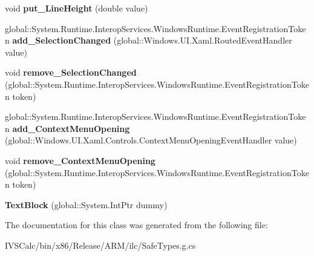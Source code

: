 \begin{DoxyCompactItemize}
void {\bfseries put\+\_\+\+Line\+Height} (double value)
\item 
\mbox{\label{class_windows_1_1_u_i_1_1_xaml_1_1_controls_1_1_text_block_af80d81341031136a13a2687720d46da0}} 
global\+::\+System.\+Runtime.\+Interop\+Services.\+Windows\+Runtime.\+Event\+Registration\+Token {\bfseries add\+\_\+\+Selection\+Changed} (global\+::\+Windows.\+U\+I.\+Xaml.\+Routed\+Event\+Handler value)
\item 
\mbox{\label{class_windows_1_1_u_i_1_1_xaml_1_1_controls_1_1_text_block_a0ec7a0aed82f465da9f07b1f0bb2f222}} 
void {\bfseries remove\+\_\+\+Selection\+Changed} (global\+::\+System.\+Runtime.\+Interop\+Services.\+Windows\+Runtime.\+Event\+Registration\+Token token)
\item 
\mbox{\label{class_windows_1_1_u_i_1_1_xaml_1_1_controls_1_1_text_block_abe06af10f87317e305ba6d841b08607c}} 
global\+::\+System.\+Runtime.\+Interop\+Services.\+Windows\+Runtime.\+Event\+Registration\+Token {\bfseries add\+\_\+\+Context\+Menu\+Opening} (global\+::\+Windows.\+U\+I.\+Xaml.\+Controls.\+Context\+Menu\+Opening\+Event\+Handler value)
\item 
\mbox{\label{class_windows_1_1_u_i_1_1_xaml_1_1_controls_1_1_text_block_ac298be0da72f4c9f2a436c5949a660d7}} 
void {\bfseries remove\+\_\+\+Context\+Menu\+Opening} (global\+::\+System.\+Runtime.\+Interop\+Services.\+Windows\+Runtime.\+Event\+Registration\+Token token)
\item 
\mbox{\label{class_windows_1_1_u_i_1_1_xaml_1_1_controls_1_1_text_block_a626ff976bc29fd838fa655f97f2533b0}} 
{\bfseries Text\+Block} (global\+::\+System.\+Int\+Ptr dummy)
\end{DoxyCompactItemize}


The documentation for this class was generated from the following file\+:\begin{DoxyCompactItemize}
\item 
I\+V\+S\+Calc/bin/x86/\+Release/\+A\+R\+M/ilc/Safe\+Types.\+g.\+cs\end{DoxyCompactItemize}
